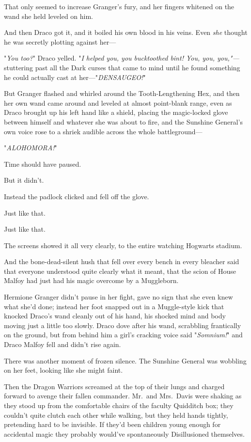 That only seemed to increase Granger's fury, and her fingers whitened on the 
wand she held leveled on him.

And then Draco got it, and it boiled his own blood in his veins. Even 
\emph{she} thought he was secretly plotting against her---

"\emph{You too?}" Draco yelled. "\emph{I helped you, you bucktoothed bint! You, 
you, you,"---} stuttering past all the Dark curses that came to mind until he 
found something he could actually cast at her---"\emph{DENSAUGEO!}"

But Granger flashed and whirled around the Tooth-Lengthening Hex, and then her 
own wand came around and leveled at almost point-blank range, even as Draco 
brought up his left hand like a shield, placing the magic-locked glove between 
himself and whatever she was about to fire, and the Sunshine General's own 
voice rose to a shriek audible across the whole battleground---

"\emph{ALOHOMORA!}"

Time should have paused.

But it didn't.

Instead the padlock clicked and fell off the glove.

Just like that.

Just like that.

The screens showed it all very clearly, to the entire watching Hogwarts stadium.

And the bone-dead-silent hush that fell over every bench in every bleacher said 
that everyone understood quite clearly what it meant, that the scion of House 
Malfoy had just had his magic overcome by a Muggleborn.

Hermione Granger didn't pause in her fight, gave no sign that she even knew 
what she'd done; instead her foot snapped out in a Muggle-style kick that 
knocked Draco's wand cleanly out of his hand, his shocked mind and body moving 
just a little too slowly. Draco dove after his wand, scrabbling frantically on 
the ground, but from behind him a girl's cracking voice said "\emph{Somnium!}" 
and Draco Malfoy fell and didn't rise again.

There was another moment of frozen silence. The Sunshine General was wobbling 
on her feet, looking like she might faint.

Then the Dragon Warriors screamed at the top of their lungs and charged forward 
to avenge their fallen commander.
\sbreak
Mr.~and Mrs.~Davis were shaking as they stood up from the comfortable chairs of 
the faculty Quidditch box; they couldn't quite clutch each other while walking, 
but they held hands tightly, pretending hard to be invisible. If they'd been 
children young enough for accidental magic they probably would've spontaneously 
Disillusioned themselves.

